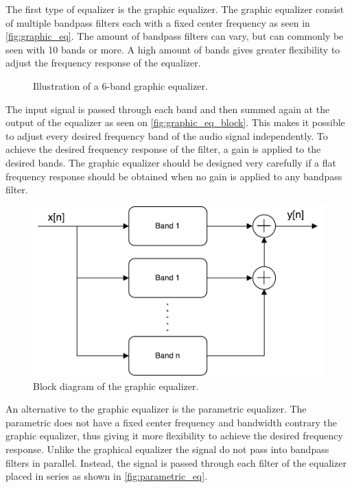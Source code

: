 The first type of equalizer is the graphic equalizer. The graphic equalizer consist of multiple bandpass filters each with a fixed center frequency as seen in \autoref{fig:graphic_eq}. The amount of bandpass filters can vary, but can commonly be seen with 10 bands or more. A high amount of bands gives greater flexibility to adjust the frequency response of the equalizer.

\begin{figure}[H]
\centering
{}

\caption{Illustration of a 6-band graphic equalizer.}
\label{fig:graphic_eq}
\end{figure}

The input signal is passed through each band and then summed again at the output of the equalizer as seen on \autoref{fig:graphic_eq_block}. This makes it possible to adjust every desired frequency band of the audio signal independently. To achieve the desired frequency response of the filter, a gain is applied to the desired bands. The graphic equalizer should be designed very carefully if a flat frequency response should be obtained when no gain is applied to any bandpass filter. %

\begin{figure}[H]
\centering
\includegraphics[width=0.6 \textwidth]{figures/graphic_eq_block.pdf}
\caption{Block diagram of the graphic equalizer.}
\label{fig:graphic_eq_block}
\end{figure}

An alternative to the graphic equalizer is the parametric equalizer. The parametric does not have a fixed center frequency and bandwidth contrary the graphic equalizer, thus giving it more flexibility to achieve the desired frequency response. Unlike the graphical equalizer the signal do not pass into bandpass filters in parallel. Instead, the signal is passed through each filter of the equalizer placed in series as shown in \autoref{fig:parametric_eq}. \\

